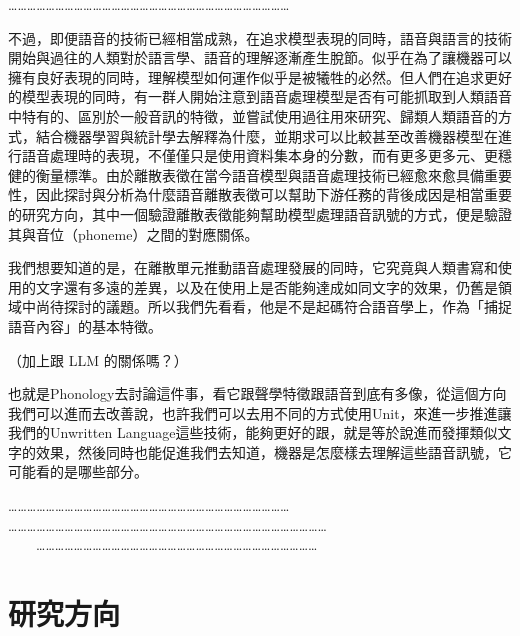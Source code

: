     ………………………………………………………………………………

    
    
   不過，即便語音的技術已經相當成熟，在追求模型表現的同時，語音與語言的技術開始與過往的人類對於語言學、語音的理解逐漸產生脫節。似乎在為了讓機器可以擁有良好表現的同時，理解模型如何運作似乎是被犧牲的必然。但人們在追求更好的模型表現的同時，有一群人開始注意到語音處理模型是否有可能抓取到人類語音中特有的、區別於一般音訊的特徵，並嘗試使用過往用來研究、歸類人類語音的方式，結合機器學習與統計學去解釋為什麼，並期求可以比較甚至改善機器模型在進行語音處理時的表現，不僅僅只是使用資料集本身的分數，而有更多更多元、更穩健的衡量標準。由於離散表徵在當今語音模型與語音處理技術已經愈來愈具備重要性，因此探討與分析為什麼語音離散表徵可以幫助下游任務的背後成因是相當重要的研究方向，其中一個驗證離散表徵能夠幫助模型處理語音訊號的方式，便是驗證其與音位（phoneme）之間的對應關係。

    我們想要知道的是，在離散單元推動語音處理發展的同時，它究竟與人類書寫和使用的文字還有多遠的差異，以及在使用上是否能夠達成如同文字的效果，仍舊是領域中尚待探討的議題。所以我們先看看，他是不是起碼符合語音學上，作為「捕捉語音內容」的基本特徵。

    （加上跟 LLM 的關係嗎？）

    也就是Phonology去討論這件事，看它跟聲學特徵跟語音到底有多像，從這個方向我們可以進而去改善說，也許我們可以去用不同的方式使用Unit，來進一步推進讓我們的Unwritten Language這些技術，能夠更好的跟，就是等於說進而發揮類似文字的效果，然後同時也能促進我們去知道，機器是怎麼樣去理解這些語音訊號，它可能看的是哪些部分。

    ……………………………………………………………………………… \\
    ………………………………………………………………………………………… \\
　　………………………………………………………………………………


\section{研究方向}


